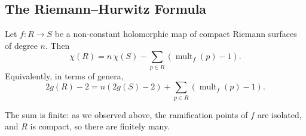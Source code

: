 \documentclass[a4paper]{scrartcl}
\newcommand{\mult}{\operatorname{mult}}
\begin{document}
\subsection{The Riemann--Hurwitz Formula}

\begin{theorem}\label{thm:RH}
	Let $f : R \to S$ be a non-constant holomorphic map of compact Riemann surfaces of
	degree $n$. Then
	$$
	\chi(R) = n\,\chi(S) - \sum_{p \in R}\left(\mult_f(p) - 1\right).
	$$
	Equivalently, in terms of genera,
	$$
	2g(R) - 2 = n\left(2g(S) - 2\right) + \sum_{p\in R}\left(\mult_f(p)-1\right).
	$$
\end{theorem}

The sum is finite: as we observed above, the ramification points of $f$ are isolated, and
$R$ is compact, so there are finitely many.
\end{document}
